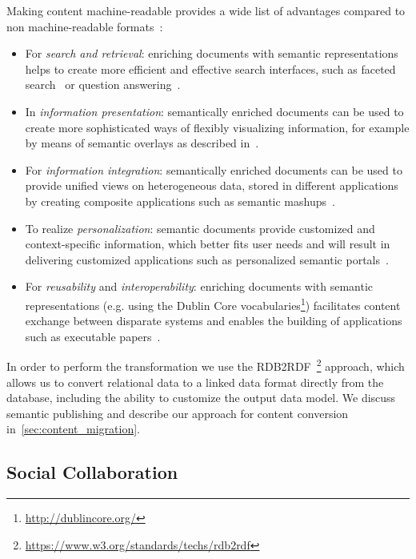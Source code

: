 \documentclass[ngerman,UKenglish,table]{scrbook}
\begin{document}
Making content machine-readable provides a wide list of advantages compared to non machine-readable formats~\cite{khalili2014semantics}:
\begin{itemize}
\item For \emph{search and retrieval}: enriching documents with semantic representations helps to create more efficient and effective search interfaces, such as faceted search~\cite{tunkelang2009faceted} or question answering~\cite{Lopez2011}.
\item In \emph{information presentation}: semantically enriched documents can be used to create more sophisticated ways of flexibly visualizing information, for example by means of semantic overlays as described in~\cite{Burel2009}.
\item For \emph{information integration}: semantically enriched documents can be used to provide unified views on heterogeneous data, stored in different applications by creating composite applications such as semantic mashups~\cite{ankolekar2007two}.
\item To realize \emph{personalization}: semantic documents provide customized and context-specific information, which better fits user needs and will result in delivering customized applications such as personalized semantic portals~\cite{ecs2007}.
\item For \emph{reusability} and \emph{interoperability}: enriching documents with semantic representations (e.g. using the Dublin Core vocabularies\footnote{\url{http://dublincore.org/}}) facilitates content exchange between disparate systems and enables the building of applications such as executable papers~\cite{Muller2011}.
\end{itemize}

In order to perform the transformation we use the RDB2RDF~\footnote{\url{https://www.w3.org/standards/techs/rdb2rdf}} approach, which allows us to convert relational data to a linked data format directly from the database, including the ability to customize the output data model.
We discuss semantic publishing and describe our approach for content conversion in~\autoref{sec:content_migration}.


\subsection{Social Collaboration}
\end{document}

